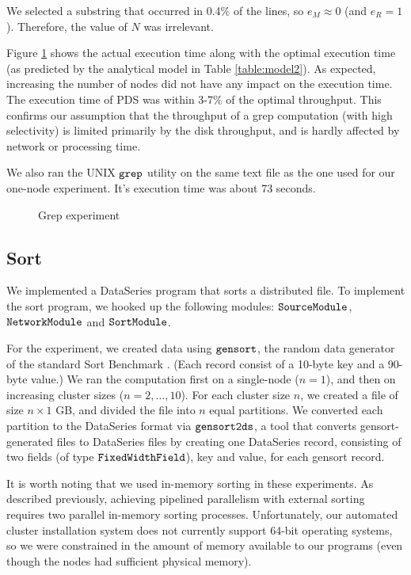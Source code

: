 \documentclass{acm_proc_article-sp}
\begin{document}
We selected a
substring that occurred in 0.4\% of the lines, so $e_M \approx 0$ (and $e_R =
1$). Therefore, the value of $N$ was irrelevant.

Figure \ref{fig:grepexperiment} shows the actual execution time along with the optimal
execution time (as predicted by the analytical model in Table
\ref{table:model2}). As expected, increasing the number of nodes did not have
any impact on the execution time. The execution time of PDS was within 3-7\% of the optimal throughput. This confirms our assumption that
the throughput of a grep computation (with high selectivity) is limited
primarily by the disk throughput, and is hardly affected by network or
processing time.

We also ran the UNIX $\tt grep$ utility on the same text file as the one used
for our one-node experiment. It's execution time was about 73 seconds.

\begin{figure}
\caption{Grep experiment}
\label{fig:grepexperiment}
\end{figure}

\subsection{Sort}

We implemented a DataSeries program that sorts a distributed file. To implement the sort program, we hooked up the following
modules: $\tt SourceModule$, $\tt NetworkModule$ and $\tt
SortModule$.

For the experiment, we created data using $\tt gensort$, the random
data generator of the standard Sort Benchmark \cite{sortbenchmark}. (Each record
consist of a 10-byte key and a 90-byte value.) We ran the computation first on
a single-node ($n = 1$), and then on increasing cluster sizes ($n = 2, \ldots,
10$). For each cluster size $n$, we created a file of size $n \times 1$ GB,
and divided the file into $n$ equal partitions. We converted each partition to
the DataSeries format via $\tt gensort2ds$, a tool that converts
gensort-generated files to DataSeries files by creating one DataSeries record,
consisting of two fields (of type $\tt FixedWidthField$), key and value, for
each gensort record.

It is worth noting that we used in-memory sorting in these experiments.
As described previously, achieving pipelined parallelism with external sorting
requires two parallel in-memory sorting processes. Unfortunately, our automated
cluster installation system does not currently support 64-bit operating
systems, so we were constrained in the amount of memory available to our
programs (even though the nodes had sufficient physical memory).
\end{document}
